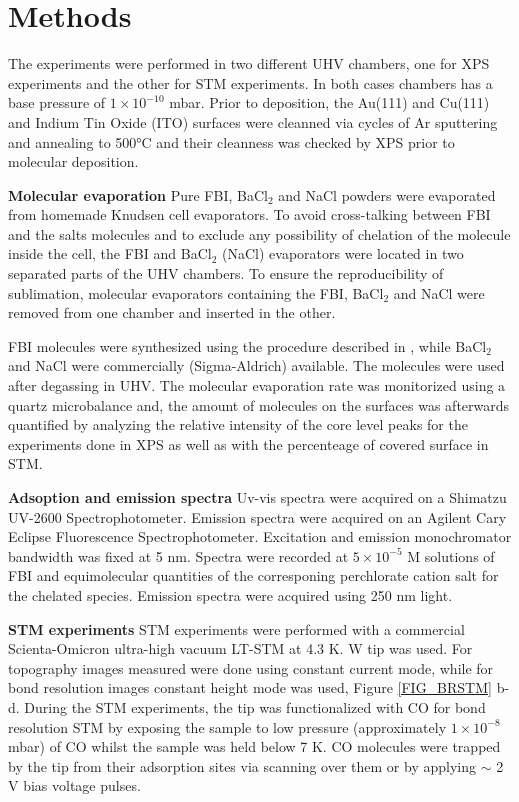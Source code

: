 \documentclass[aps,prl,reprint,longbibliography,superscriptaddress, english]{revtex4-1}
\def\BappCl{BaCl$_2$ }
\begin{document}
\section{Methods}
The experiments were performed in two different UHV chambers, one for XPS experiments and the other for STM experiments. In both cases chambers has a base pressure of $1\times10^{-10}$ mbar. Prior to deposition, the Au(111) and Cu(111) and Indium Tin Oxide (ITO) surfaces were cleanned via cycles of Ar sputtering and annealing to 500°C and their cleanness was checked by XPS prior to molecular deposition. 

\textbf{Molecular evaporation}
Pure FBI, \BappCl and NaCl powders were evaporated from homemade Knudsen cell evaporators. To avoid cross-talking between FBI and the salts molecules and to exclude any possibility of chelation of the molecule inside the cell, the FBI and \BappCl (NaCl) evaporators were located in two separated parts of the UHV chambers. To ensure the reproducibility of sublimation, molecular evaporators containing the FBI, \BappCl and NaCl were removed from one chamber and inserted in the other.  

FBI molecules were synthesized using the procedure described in \cite{rivilla_fluorescent_2020}, while \BappCl and NaCl were commercially (Sigma-Aldrich) available. The molecules were used after degassing in UHV.
The molecular evaporation rate was monitorized using a quartz microbalance and, the amount of molecules on the surfaces was afterwards quantified by analyzing the relative intensity of the core level peaks for the experiments done in XPS as well as with the percenteage of covered surface in STM. 

\textbf{Adsoption and emission spectra}
 Uv-vis spectra were acquired on a Shimatzu UV-2600 Spectrophotometer. Emission spectra were acquired on an Agilent Cary Eclipse Fluorescence Spectrophotometer. Excitation and emission monochromator bandwidth was fixed at 5 nm. Spectra were recorded at $5\times10^{-5}$ M solutions of FBI and equimolecular quantities of the corresponing perchlorate cation salt for the chelated species. Emission spectra were acquired using 250 nm light.

\textbf{STM experiments}
STM experiments were performed with a commercial Scienta-Omicron ultra-high vacuum LT-STM at 4.3 K. W tip  was used. For topography images measured were done using constant current mode, while for bond resolution images constant height mode was used, Figure \ref{FIG_BRSTM} b-d. During the STM experiments, the tip was functionalized with CO for bond resolution STM by exposing the sample to low pressure (approximately $1 \times 10^{-8}$ mbar) of CO whilst the sample was held below 7 K. CO molecules were trapped by the tip from their adsorption sites via scanning over them or by applying $\sim$ 2 V bias voltage pulses. 
\end{document}

